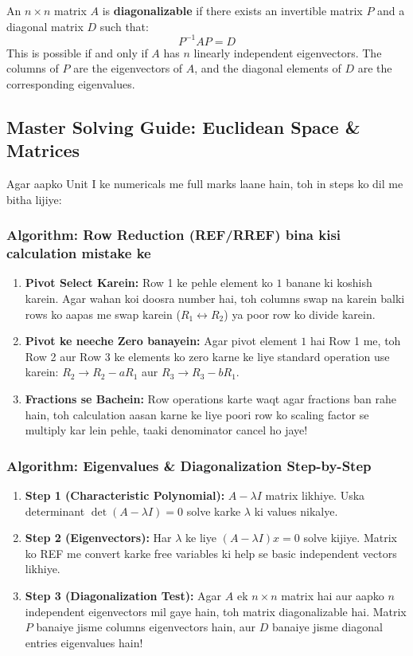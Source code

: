 \documentclass[11pt,a4paper]{article}
\begin{document}
\begin{definitionbox}[Diagonalization]
An $n \times n$ matrix $A$ is \textbf{diagonalizable} if there exists an invertible matrix $P$ and a diagonal matrix $D$ such that:
\[ P^{-1} A P = D \]
This is possible if and only if $A$ has $n$ linearly independent eigenvectors. The columns of $P$ are the eigenvectors of $A$, and the diagonal elements of $D$ are the corresponding eigenvalues.
\end{definitionbox}

\subsection{Master Solving Guide: Euclidean Space \& Matrices}

Agar aapko Unit I ke numericals me full marks laane hain, toh in steps ko dil me bitha lijiye:

\subsubsection{Algorithm: Row Reduction (REF/RREF) bina kisi calculation mistake ke}
\begin{enumerate}
    \item \textbf{Pivot Select Karein:} Row 1 ke pehle element ko $1$ banane ki koshish karein. Agar wahan koi doosra number hai, toh columns swap na karein balki rows ko aapas me swap karein ($R_1 \leftrightarrow R_2$) ya poor row ko divide karein.
    \item \textbf{Pivot ke neeche Zero banayein:} Agar pivot element $1$ hai Row 1 me, toh Row 2 aur Row 3 ke elements ko zero karne ke liye standard operation use karein: $R_2 \to R_2 - a R_1$ aur $R_3 \to R_3 - b R_1$.
    \item \textbf{Fractions se Bachein:} Row operations karte waqt agar fractions ban rahe hain, toh calculation aasan karne ke liye poori row ko scaling factor se multiply kar lein pehle, taaki denominator cancel ho jaye!
\end{enumerate}

\subsubsection{Algorithm: Eigenvalues \& Diagonalization Step-by-Step}
\begin{enumerate}
    \item \textbf{Step 1 (Characteristic Polynomial):} $A - \lambda I$ matrix likhiye. Uska determinant $\det(A - \lambda I) = 0$ solve karke $\lambda$ ki values nikalye.
    \item \textbf{Step 2 (Eigenvectors):} Har $\lambda$ ke liye $(A - \lambda I)x = 0$ solve kijiye. Matrix ko REF me convert karke free variables ki help se basic independent vectors likhiye.
    \item \textbf{Step 3 (Diagonalization Test):} Agar $A$ ek $n \times n$ matrix hai aur aapko $n$ independent eigenvectors mil gaye hain, toh matrix diagonalizable hai. Matrix $P$ banaiye jisme columns eigenvectors hain, aur $D$ banaiye jisme diagonal entries eigenvalues hain!
\end{enumerate}
\end{document}
